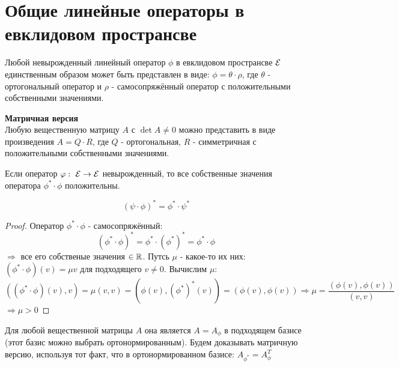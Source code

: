 \section{Общие линейные операторы в евклидовом пространсве}
\begin{theorem}
    Любой невырожденный линейный оператор $\phi$ в евклидовом пространсве $\mathcal{E}$ единственным образом может быть представлен в виде: $\phi = \theta \cdot \rho$, где $\theta$ - ортогональный оператор и $\rho$ - самосопряжённый оператор с положительными собственными значениями. 
\end{theorem}
\begin{theorem} \textbf{Матричная версия}\\
    Любую вещественную матрицу $A$ с $\det A \neq 0$ можно представить в виде произведения $A = Q \cdot R$, где $Q$ - ортогональная, $R$ - симметричная с положительными собственными значениями.      
\end{theorem}
\begin{lemma}
    Если оператор $\varphi: \ \mathcal{E} \to \mathcal{E}$ невырожденный, то все собственные значения оператора $\phi^* \cdot \phi$ положительны.  
\end{lemma} 
\begin{subtheorem}
    $$(\psi \cdot \phi)^* = \phi^* \cdot \psi^*$$ 
\end{subtheorem} 
 \begin{proof}
    Оператор $\phi^* \cdot \phi$ - самосопряжённый: 
    $$(\phi^* \cdot \phi)^* = \phi^* \cdot (\phi^*)^* = \phi^* \cdot \phi$$
    $\Longrightarrow $ все его собственые значения $\in \mathbb{R}$. Путсь $\mu$ - какое-то их них: $(\phi^* \cdot \phi)(v) = \mu v$ для подходящего $v \neq 0$. Вычислим $\mu$: 
    $$((\phi^* \cdot \phi)(v),v) = \mu(v,v) = (\phi(v),(\phi^*)^*(v)) = (\phi(v), \phi(v)) \Longrightarrow \mu = \frac{(\phi(v),\phi(v))}{(v,v)}$$
    $\Longrightarrow \mu>0$     
 \end{proof} 
 \begin{remark}
    Для любой вещественной матрицы $A$ она является $A = A_\phi$ в подходящем базисе (этот базис можно выбрать ортонормированным). Будем доказывать матричную версию, используя тот факт, что в ортонормированном базисе: $A_{\phi^*} = A_\phi^T$  
 \end{remark} 